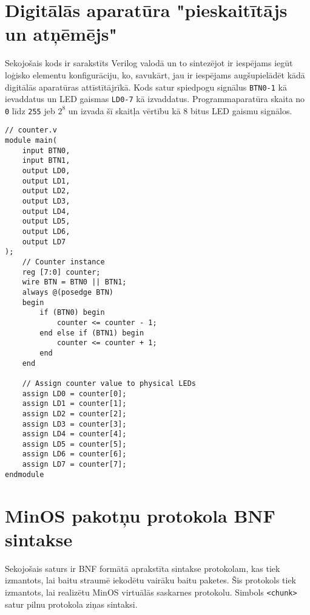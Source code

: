 \renewcommand{\thesection}{\arabic{section}}
\titleformat{\section}{\normalfont\large\bfseries}{\thesection. Pielikums.}{1em}{}

\section{Digitālās aparatūra "pieskaitītājs un atņēmējs"}
\label{att:counter}

Sekojošais kods ir sarakstīts Verilog valodā un to sintezējot ir iespējams iegūt
loģisko elementu konfigurāciju, ko, savukārt, jau ir iespējams augšupielādēt
kādā digitālās aparatūras attīstītājrīkā. Kods satur spiedpogu signālus
\lstinline!BTN0-1! kā ievaddatus un LED gaismas \lstinline!LD0-7! kā izvaddatus.
Programmaparatūra skaita no \lstinline!0! līdz \lstinline!255! jeb \(2^8\) un
izvada šī skaitļa vērtību kā 8 bitus LED gaismu signālos. 

\begin{lstlisting}
// counter.v
module main(
    input BTN0,
    input BTN1,
    output LD0,
    output LD1,
    output LD2,
    output LD3,
    output LD4,
    output LD5,
    output LD6,
    output LD7
);
    // Counter instance
    reg [7:0] counter;
    wire BTN = BTN0 || BTN1;
    always @(posedge BTN)
    begin
        if (BTN0) begin
            counter <= counter - 1;
        end else if (BTN1) begin
            counter <= counter + 1;
        end
    end

    // Assign counter value to physical LEDs
    assign LD0 = counter[0];
    assign LD1 = counter[1];
    assign LD2 = counter[2];
    assign LD3 = counter[3];
    assign LD4 = counter[4];
    assign LD5 = counter[5];
    assign LD6 = counter[6];
    assign LD7 = counter[7];
endmodule    
\end{lstlisting}
  
\section{MinOS pakotņu protokola BNF sintakse}
\label{att:minosbnf}

Sekojošais saturs ir BNF formātā aprakstīta sintakse protokolam, kas tiek
izmantots, lai baitu straumē iekodētu vairāku baitu paketes. Šis protokols tiek
izmantots, lai realizētu MinOS virtuālās saskarnes protokolu. Simbols
\lstinline!<chunk>! satur pilnu protokola ziņas sintaksi. 


